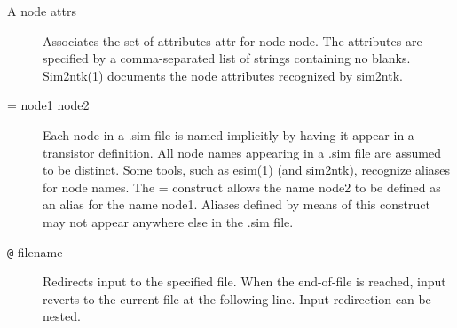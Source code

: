 \begin{description}
\item[A node attrs]
Associates the set of attributes attr for node node.
The attributes are specified by a comma-separated list
of strings containing no blanks.  Sim2ntk(1) documents
the node attributes recognized by sim2ntk.

\item[= node1 node2]
Each node in a .sim file is named implicitly by having
it appear in a transistor definition.  All node names
appearing in a .sim file are assumed to be distinct.
Some tools, such as esim(1) (and sim2ntk), recognize
aliases for node names.  The = construct allows the
name node2 to be defined as an alias for the name
node1.  Aliases defined by means of this construct may
not appear anywhere else in the .sim file.

\item[\verb!@! filename]
Redirects input to the specified file.  When the end-of-file
is reached, input reverts to the current file at the following line. 
Input redirection can be nested.

\end{description}
